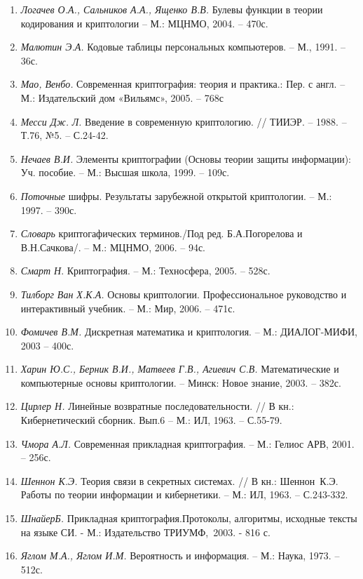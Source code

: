\documentclass[a4paper]{article}
\newcounter{}
\begin{document}
\begin{enumerate}
\begin{enumerate}
\item \textit{ }\textit{Логачев О.А., Сальников А.А., Ященко В.В.} Булевы
функции в теории кодирования и криптологии – М.: МЦНМО, 2004. – 470с.
\item \textit{ }\textit{Малютин Э.А.} Кодовые таблицы персональных компьютеров.
– М., 1991. – 36с.
\item \textit{ Мао, Венбо. }Современная  криптография: теория и практика.: Пер.
с англ. – М.: Издательский дом «Вильямс»,  2005. – 768с
\item \textit{ }\textit{Месси Дж.}\textit{ }\textit{Л.} Введение в современную
криптологию. // ТИИЭР. – 1988. – Т.76, №5. – С.24-42.
\item \textit{ Н}\textit{ечаев В.И.} Элементы криптографии (Основы теории защиты
информации):  Уч.  пособие. – М.: Высшая школа, 1999. – 109с.
\item \textit{ }\textit{Поточные} шифры. Результаты зарубежной открытой
криптологии. – М.: 1997. –  390с. 
\item \textit{Словарь} криптогафических терминов./Под ред. Б.А.Погорелова и
В.Н.Сачкова/. – М.: МЦНМО, 2006. – 94с.
\item \textit{\textcolor[rgb]{0.2,0.2,0.2}{Смарт
Н}}\textcolor[rgb]{0.2,0.2,0.2}{. Криптография. }–
\textcolor[rgb]{0.2,0.2,0.2}{ М.: Техносфера, 2005. }–
\textcolor[rgb]{0.2,0.2,0.2}{ 528с.}
\item \textit{Тилборг Ван Х.К.А.} Основы криптологии. Профессиональное
руководство и интерактивный учебник. –  М.: Мир, 2006. – 471с.
\item \textit{Фомичев В.М.} Дискретная математика и криптология. – М.:
ДИАЛОГ-МИФИ, 2003 – 400с.
\item \textit{Харин Ю.С., Берник В.И., Матвеев Г.В., Агиевич С.В.
}Математические и компьютерные основы криптологии. – Минск: Новое знание, 2003.
– 382с.
\item \textit{Цирлер Н.} Линейные возвратные последовательности. // В кн.:
Кибернетический сборник. Вып.6 – М.: ИЛ, 1963. – С.55-79.
\item \textit{Чмора А.Л.} Современная прикладная криптография. –  М.: Гелиос
АРВ,  2001. – 256с.
\item \textit{Шеннон К.Э.} Теория связи в секретных системах. // В кн.:
Шеннон~К.Э. Работы по теории информации и кибернетики. – М.: ИЛ, 1963. –
С.243-332.
\item {\color[rgb]{0.2,0.2,0.2}
\textit{ШнайерБ. }Прикладная криптография.Протоколы, алгоритмы,\newline
исходные тексты на языке СИ. - М.: Издательство ТРИУМФ,~2003. - 816 с\textsf{.}}
\item \textit{Яглом М.А., Яглом И.М.} Вероятность и информация. – М.: Наука,
1973. – 512с. 
\end{enumerate}
\end{enumerate}
\end{document}
